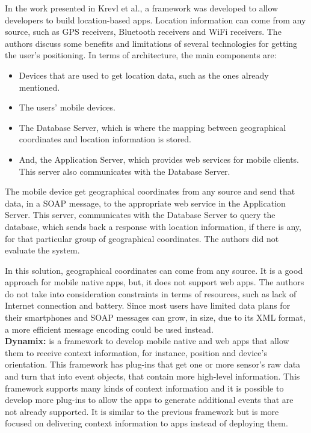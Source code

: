 In the work presented in Krevl et al.\cite{Krevl2006}, 
a framework
was developed to allow developers to build
location-based apps. Location information can come
from any source, such as GPS receivers, Bluetooth
receivers and WiFi receivers.
The authors discuss some benefits and limitations
of several technologies for getting the
user's positioning.
In terms of architecture, the main components
are:
\begin{itemize}
\item
Devices that are used to get location data, such as
the ones already mentioned. 
\item The users' mobile devices.
\item The Database Server, which is where the mapping
between geographical coordinates and location
information is stored.
\item And, the Application Server, which provides web services for
mobile clients. This server also communicates
with the Database Server.
\end{itemize}
The mobile device get geographical coordinates
from any source and send that data, in a
SOAP \cite{Seely:2001:SCP:560836} message,
to the appropriate web service in the Application
Server. This server, communicates with the Database Server
to query the database, which sends back a response with
location information, if there is any, for that
particular group of geographical coordinates.
The authors did not evaluate the system.

In this solution, geographical coordinates can
come from any source. It is a good approach for
mobile native apps, but, it does not support web apps.
The authors do not take into consideration
constraints in terms of resources, such as
lack of Internet connection and battery.
Since most users have limited data plans for
their smartphones and SOAP messages can
grow, in size, due to its XML format,
a more efficient message encoding could be used
instead.
\\
\textbf{Dynamix\cite{Carlson2012}:}
is a framework to develop
mobile native and web apps that allow them to receive
context information, for instance, position and device's
orientation. This framework has plug-ins that get
one or more sensor's raw data and turn that into event
objects, that contain more high-level information.
This framework supports many kinds of context information
and it is possible to develop more plug-ins to allow the
apps to generate additional events that are not
already supported. It is similar to the previous
framework but is more focused on delivering context
information to apps instead of deploying them.

